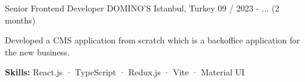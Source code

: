 

\begin{cventries}

\cventry
  {Senior Frontend Developer} %
  {DOMINO'S} %
  {Istanbul, Turkey} %
  {09 / 2023 - ... (2 months)}
  {
    \begin{cvitems} %
      \item {Developed a CMS application from scratch which is a backoffice application for the new business.}
      \item {\textbf {Skills:} React.js · TypeScript · Redux.js · Vite · Material UI}
    \end{cvitems}
  }


\end{cventries}
